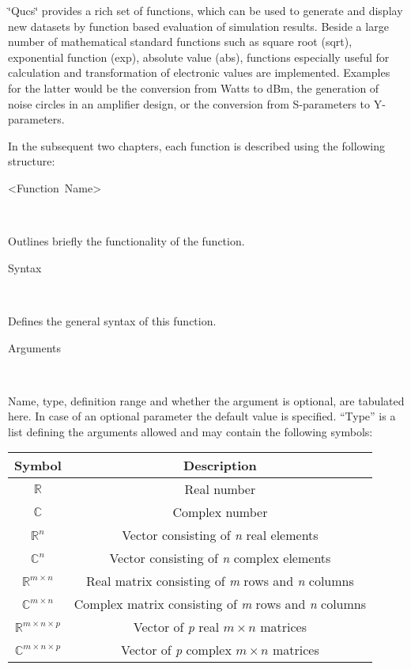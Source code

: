 \providecommand{\boldsymbol}[1]{\mbox{\boldmath $#1$}}

\providecommand{\tabularnewline}{\\}


\char`\"{}Qucs\char`\"{} provides a rich set of functions, which can
be used to generate and display new datasets by function based evaluation
of simulation results. Beside a large number of mathematical standard
functions such as square root (sqrt), exponential function (exp),
absolute value (abs), functions especially useful for calculation
and transformation of electronic values are implemented. Examples
for the latter would be the conversion from Watts to dBm, the generation
of noise circles in an amplifier design, or the conversion from S-parameters
to Y-parameters.



In the subsequent two chapters, each function is described using the
following structure: 

\begin{description}
\item [<Function~Name>]~
\end{description}
Outlines briefly the functionality of the function.

\begin{description}
\item [Syntax]~
\end{description}
Defines the general syntax of this function.

\begin{description}
\item [Arguments]~
\end{description}
Name, type, definition range and whether the argument is optional,
are tabulated here. In case of an optional parameter the default value
is specified. {}``Type'' is a list defining the arguments allowed
and may contain the following symbols:
\medskip{}

\begin{tabular}{|c|c|}
\hline 
Symbol&
Description\tabularnewline
\hline
\hline 
$\mathbb{R}$&
Real number\tabularnewline
\hline 
$\mathbb{C}$&
Complex number\tabularnewline
\hline 
$\mathbb{R}^{n}$&
Vector consisting of \textit{n} real elements\tabularnewline
\hline 
$\mathbb{C}^{n}$&
Vector consisting of \textit{n} complex elements\tabularnewline
\hline
$\mathbb{R}^{m\times n}$&
Real matrix consisting of \textit{m} rows and \textit{n} columns\tabularnewline
\hline
$\mathbb{\mathbb{C}}^{m\times n}$&
Complex matrix consisting of \textit{m} rows and \textit{n} columns\tabularnewline
\hline
$\mathbb{R}^{m\times n\times p}$&
Vector of \textit{p} real $m\times n$ matrices\tabularnewline
\hline
$\mathbb{\mathbb{C}}^{m\times n\times p}$&
Vector of \textit{p} complex $m\times n$ matrices\tabularnewline
\hline
\end{tabular}

